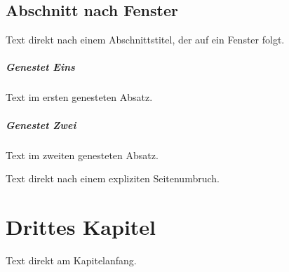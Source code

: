 \documentclass[type=report,theme=light,language=de]{semio}
\begin{document}
\section{Abschnitt nach Fenster}

Text direkt nach einem Abschnittstitel, der auf ein Fenster folgt.

\begin{SemioNest}
\paragraph{Genestet Eins}
Text im ersten genesteten Absatz.
\paragraph{Genestet Zwei}
Text im zweiten genesteten Absatz.
\end{SemioNest}

\newpage
Text direkt nach einem expliziten Seitenumbruch.

\chapter{Drittes Kapitel}
Text direkt am Kapitelanfang.
\end{document}
